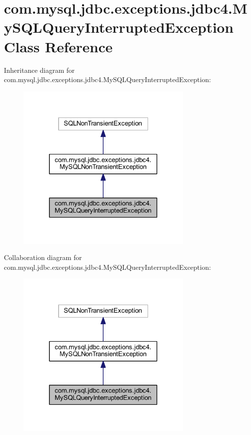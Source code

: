 \hypertarget{classcom_1_1mysql_1_1jdbc_1_1exceptions_1_1jdbc4_1_1_my_s_q_l_query_interrupted_exception}{}\section{com.\+mysql.\+jdbc.\+exceptions.\+jdbc4.\+My\+S\+Q\+L\+Query\+Interrupted\+Exception Class Reference}
\label{classcom_1_1mysql_1_1jdbc_1_1exceptions_1_1jdbc4_1_1_my_s_q_l_query_interrupted_exception}


Inheritance diagram for com.\+mysql.\+jdbc.\+exceptions.\+jdbc4.\+My\+S\+Q\+L\+Query\+Interrupted\+Exception\+:
\nopagebreak
\begin{figure}[H]
\begin{center}
\leavevmode
\includegraphics[width=245pt]{classcom_1_1mysql_1_1jdbc_1_1exceptions_1_1jdbc4_1_1_my_s_q_l_query_interrupted_exception__inherit__graph}
\end{center}
\end{figure}


Collaboration diagram for com.\+mysql.\+jdbc.\+exceptions.\+jdbc4.\+My\+S\+Q\+L\+Query\+Interrupted\+Exception\+:
\nopagebreak
\begin{figure}[H]
\begin{center}
\leavevmode
\includegraphics[width=245pt]{classcom_1_1mysql_1_1jdbc_1_1exceptions_1_1jdbc4_1_1_my_s_q_l_query_interrupted_exception__coll__graph}
\end{center}
\end{figure}
